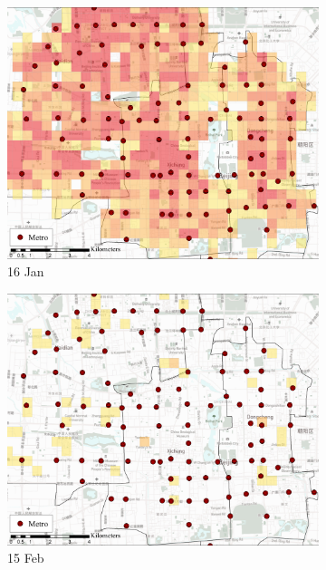 \documentclass[preprints,ijgi,submit,moreauthors]{Definitions/mdpi}
\begin{document}
\begin{figure}[H]
    \centering
    \begin{subfigure}{.32\textwidth}
        \includegraphics[width=\textwidth]{Figures/Relation_with_POIs/POIsMetroD2020_01_16.pdf}
        \caption{16 Jan}
    \end{subfigure}
    \begin{subfigure}{.32\textwidth}
        \includegraphics[width=\textwidth]{Figures/Relation_with_POIs/POIsMetroD2020_02_15.pdf}
        \caption{15 Feb}
    \end{subfigure}
    \begin{subfigure}{.32\textwidth}

\end{subfigure}
\end{figure}
\end{document}
